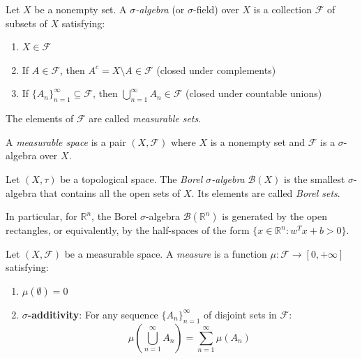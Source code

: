 \begin{definition}\label{def:sigma_algebra}
	Let $X$ be a nonempty set. A \textit{$\sigma$-algebra} (or $\sigma$-field) over $X$ is a collection $\mathcal{F}$ of subsets of $X$ satisfying:
	\begin{enumerate}
		\item $X \in \mathcal{F}$
		\item If $A \in \mathcal{F}$, then $A^c = X \setminus A \in \mathcal{F}$ (closed under complements)
		\item If $\{A_n\}_{n=1}^\infty \subseteq \mathcal{F}$, then $\bigcup_{n=1}^\infty A_n \in \mathcal{F}$ (closed under countable unions)
	\end{enumerate}
	The elements of $\mathcal{F}$ are called \textit{measurable sets}.
\end{definition}

\begin{definition}\label{def:espacio_medible}
	A \textit{measurable space} is a pair $(X, \mathcal{F})$ where $X$ is a nonempty set and $\mathcal{F}$ is a $\sigma$-algebra over $X$.
\end{definition}

\begin{definition}\label{def:sigma_algebra_borel}
	Let $(X, \tau)$ be a topological space. The \textit{Borel $\sigma$-algebra} $\mathcal{B}(X)$ is the smallest $\sigma$-algebra that contains all the open sets of $X$. Its elements are called \textit{Borel sets}.
\end{definition}

In particular, for $\mathbb{R}^n$, the Borel $\sigma$-algebra $\mathcal{B}(\mathbb{R}^n)$ is generated by the open rectangles, or equivalently, by the half-spaces of the form $\{x \in \mathbb{R}^n : w^T x + b > 0\}$.

\begin{definition}[Measure]\label{def:medida}
	Let $(X, \mathcal{F})$ be a measurable space. A \textit{measure} is a function $\mu: \mathcal{F} \to [0, +\infty]$ satisfying:
	\begin{enumerate}
		\item $\mu(\emptyset) = 0$
		\item \textbf{$\sigma$-additivity}: For any sequence $\{A_n\}_{n=1}^\infty$ of disjoint sets in $\mathcal{F}$:
		\[
			\mu\left(\bigcup_{n=1}^\infty A_n\right) = \sum_{n=1}^\infty \mu(A_n)
		\]
	\end{enumerate}
\end{definition}

